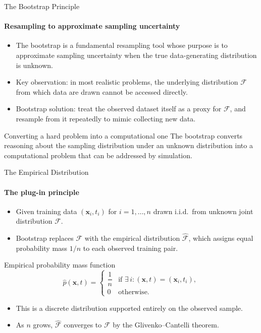 \begin{frame}{The Bootstrap Principle}
  \framesubtitle{Resampling to approximate sampling uncertainty}
  \begin{itemize}
    \item The \alert{bootstrap} is a fundamental resampling tool whose purpose is to approximate
          sampling uncertainty when the true data-generating distribution is unknown.
    \item Key observation: in most realistic problems, the underlying distribution $\mathcal{F}$
          from which data are drawn cannot be accessed directly.
    \item Bootstrap solution: treat the observed dataset itself as a \alert{proxy for $\mathcal{F}$},
          and resample from it repeatedly to mimic collecting new data.
  \end{itemize}
  \begin{block}{Converting a hard problem into a computational one}
    The bootstrap converts reasoning about the sampling distribution under an unknown distribution
    into a \alert{computational problem} that can be addressed by simulation.
  \end{block}
\end{frame}

\begin{frame}{The Empirical Distribution}
  \framesubtitle{The plug-in principle}
  \begin{itemize}
    \item Given training data $(\mathbf{x}_i, t_i)$ for $i = 1, \ldots, n$ drawn i.i.d.\ from
          unknown joint distribution $\mathcal{F}$.
    \item Bootstrap replaces $\mathcal{F}$ with the \alert{empirical distribution}
          $\hat{\mathcal{F}}$, which assigns equal probability mass $1/n$ to each observed
          training pair.
  \end{itemize}
  \begin{block}{Empirical probability mass function}
    \[
    \hat{p}(\mathbf{x}, t) =
    \begin{cases}
    \dfrac{1}{n} & \text{if } \exists\, i : (\mathbf{x}, t) = (\mathbf{x}_i, t_i), \\
    0            & \text{otherwise.}
    \end{cases}
    \]
  \end{block}
  \begin{itemize}
    \item This is a discrete distribution supported entirely on the observed sample.
    \item As $n$ grows, $\hat{\mathcal{F}}$ converges to $\mathcal{F}$ by the
          \alert{Glivenko--Cantelli theorem}.
  \end{itemize}
\end{frame}

